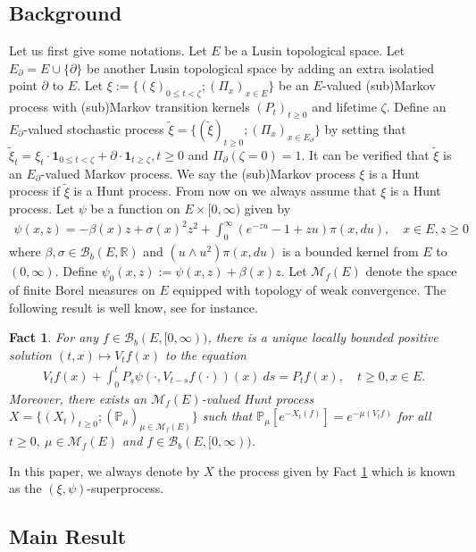 \documentclass[12pt,a4paper]{amsart}
\numberwithin{equation}{section}
\theoremstyle{plain}
\newtheorem{fact}[thm]{Fact}
\theoremstyle{definition}
\theoremstyle{remark}
\newcounter{N}
\newcounter{n}[N]
\begin{document}
\subsection{Background} \label{sec:BGD}
Let us first give some notations.
Let $E$ be a Lusin topological space.
Let $E_\partial = E\cup\{\partial\} $ be another Lusin topological space by adding an extra isolatied point $\partial$ to $E$.
Let $\xi:= \{(\xi)_{0\leq t < \zeta}; (\Pi_x)_{x\in E}\}$ be an $E$-valued (sub)Markov process with (sub)Markov transition kernels $(P_t)_{t\geq 0}$ and lifetime $\zeta$.
Define an $E_\partial$-valued stochastic process $\tilde \xi = \{(\tilde \xi)_{t\geq 0} ; (\Pi_{x})_{x\in {E_\partial}}\} $ by setting that $\tilde \xi_t = \xi_t\cdot \mathbf 1_{0\leq t< \zeta} + \partial \cdot \mathbf 1_{t\geq \zeta}, t\geq 0$ and $\Pi_\partial (\zeta = 0) = 1$.
It can be verified that $\tilde \xi$ is an $E_\partial$-valued Markov process.
We say the (sub)Markov process $\xi$ is a Hunt process if $\tilde \xi$ is a Hunt process.
From now on we always assume that $\xi$ is a Hunt process.
Let $\psi$ be a function on $E \times [0,\infty)$ given by
\begin{align}
\psi(x,z)
= -\beta(x) z + \sigma(x)^2 z^2 + \int_0^\infty (e^{-zu} -1 + zu) \pi(x,du),
\quad x\in E, z\geq 0
\end{align}
where $\beta, \sigma \in \mathcal B_b(E,\mathbb R)$ and $(u \wedge u^2) \pi(x,du)$ is a bounded kernel from $E$ to $(0,\infty)$.
Define $\psi_0(x, z):=\psi(x,z)+\beta(x) z$.
Let $\mathcal M_f(E)$ denote the space of finite Borel measures on $E$ equipped with topology of weak convergence.
The following result is well know, see \cite{Li2011MeasureValued} for instance.
\begin{fact} \label{Fact:S!}
For any $f \in \mathcal B_b(E, [0,\infty))$, there is a unique locally bounded positive solution $(t,x)\mapsto V_tf(x)$ to the equation
\begin{align}
V_tf(x) + \int_0^t P_{s} \psi(\cdot, V_{t-s}f(\cdot)) (x)~ds
= P_tf(x), \quad t\geq 0, x\in E.
\end{align}
Moreover, there exists an $\mathcal M_f(E)$-valued Hunt process $X =\{(X_t)_{t\geq 0}; (\mathbb P_\mu)_{\mu \in \mathcal M_f(E)}\}$ such that  $\mathbb P_\mu[e^{- X_t(f)}]  = e^{- \mu(V_tf)}$ for all $t\geq 0,~\mu \in \mathcal M_f(E)$ and $f \in \mathcal B_b(E,[0,\infty))$.
\end{fact}
In this paper, we always denote by $X$ the process given by Fact \ref{Fact:S!} which is known as the $(\xi, \psi)$-superprocess.
\subsection{Main Result} \label{sec:MR}
\end{document}
